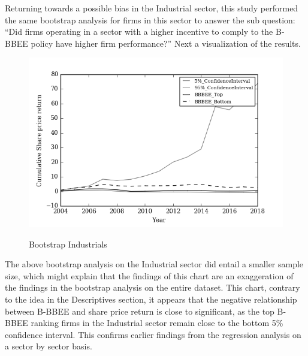 Returning towards a possible bias in the Industrial sector, this study performed the same bootstrap analysis for firms in this sector to answer the sub question: “Did firms operating in a sector with a higher incentive to comply to the B-BBEE policy have higher firm performance?” Next a visualization of the results. 
\newpage
\begin{figure}[H]
  \centering
  \includegraphics [scale=0.75]{Images/Bootstrap_Industrials.png} \\
  {\small {\it \caption{Bootstrap Industrials \label{fig:moun} }}}
\end{figure}
The above bootstrap analysis on the Industrial sector did entail a smaller sample size, which might explain that the findings of this chart are an exaggeration of the findings in the bootstrap analysis on the entire dataset. This chart, contrary to the idea in the Descriptives section, it appears that the negative relationship between B-BBEE and share price return is close to significant, as the top B-BBEE ranking firms in the Industrial sector remain close to the bottom 5\% confidence interval. This confirms earlier findings from the regression analysis on a sector by sector basis. 

